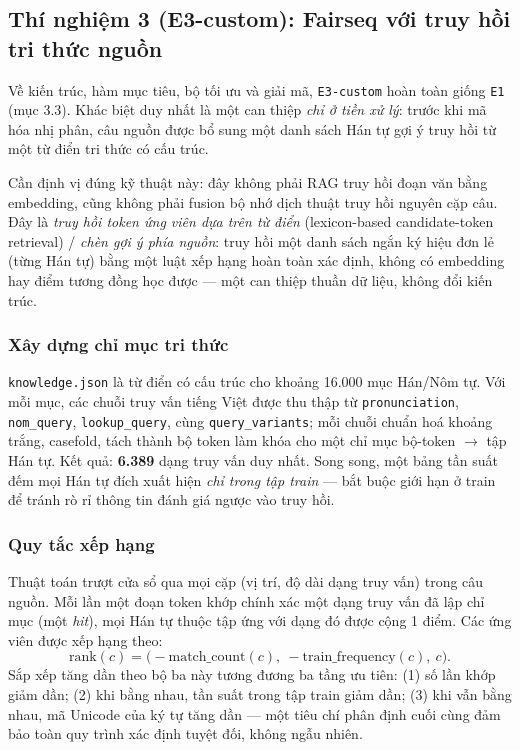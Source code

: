 \subsection{Thí nghiệm 3 (E3-custom): Fairseq với truy hồi tri thức nguồn}

Về kiến trúc, hàm mục tiêu, bộ tối ưu và giải mã, \texttt{E3-custom} hoàn toàn giống
\texttt{E1} (mục 3.3). Khác biệt duy nhất là một can thiệp \textit{chỉ ở tiền xử lý}:
trước khi mã hóa nhị phân, câu nguồn được bổ sung một danh sách Hán tự gợi ý truy hồi từ
một từ điển tri thức có cấu trúc.

Cần định vị đúng kỹ thuật này: đây không phải RAG truy hồi đoạn văn bằng embedding, cũng
không phải fusion bộ nhớ dịch thuật truy hồi nguyên cặp câu. Đây là \textit{truy hồi
token ứng viên dựa trên từ điển} (lexicon-based candidate-token retrieval) / \textit{chèn
gợi ý phía nguồn}: truy hồi một danh sách ngắn ký hiệu đơn lẻ (từng Hán tự) bằng một luật
xếp hạng hoàn toàn xác định, không có embedding hay điểm tương đồng học được — một can
thiệp thuần dữ liệu, không đổi kiến trúc.

\subsubsection{Xây dựng chỉ mục tri thức}

\texttt{knowledge.json} là từ điển có cấu trúc cho khoảng 16.000 mục Hán/Nôm tự. Với mỗi
mục, các chuỗi truy vấn tiếng Việt được thu thập từ \texttt{pronunciation},
\texttt{nom\_query}, \texttt{lookup\_query}, cùng \texttt{query\_variants}; mỗi chuỗi
chuẩn hoá khoảng trắng, casefold, tách thành bộ token làm khóa cho một chỉ mục
bộ-token $\rightarrow$ tập Hán tự. Kết quả: \textbf{6.389} dạng truy vấn duy nhất. Song
song, một bảng tần suất đếm mọi Hán tự đích xuất hiện \textit{chỉ trong tập train} — bắt
buộc giới hạn ở train để tránh rò rỉ thông tin đánh giá ngược vào truy hồi.

\subsubsection{Quy tắc xếp hạng}

Thuật toán trượt cửa sổ qua mọi cặp (vị trí, độ dài dạng truy vấn) trong câu nguồn. Mỗi
lần một đoạn token khớp chính xác một dạng truy vấn đã lập chỉ mục (một \textit{hit}),
mọi Hán tự thuộc tập ứng với dạng đó được cộng 1 điểm. Các ứng viên được xếp hạng theo:
\begin{equation}
  \mathrm{rank}(c) = \bigl(-\mathrm{match\_count}(c),\ -\mathrm{train\_frequency}(c),\ c\bigr).
  \label{eq:e3-rank}
\end{equation}
Sắp xếp tăng dần theo bộ ba này tương đương ba tầng ưu tiên: (1) số lần khớp giảm dần;
(2) khi bằng nhau, tần suất trong tập train giảm dần; (3) khi vẫn bằng nhau, mã Unicode
của ký tự tăng dần — một tiêu chí phân định cuối cùng đảm bảo toàn quy trình xác định
tuyệt đối, không ngẫu nhiên.

